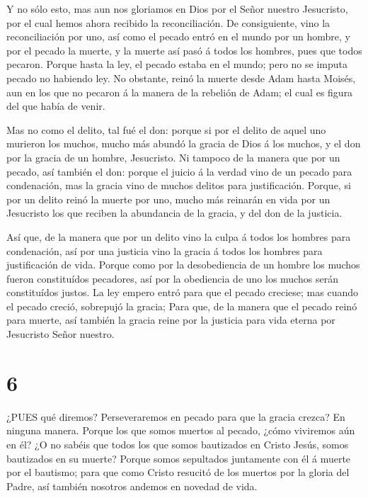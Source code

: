  Y no sólo esto, mas aun nos gloriamos en Dios por el Señor
nuestro Jesucristo, por el cual hemos ahora recibido la reconciliación.
 De consiguiente, vino la reconciliación por uno, así como
el pecado entró en el mundo por un hombre, y por el pecado la muerte, y
la muerte así pasó á todos los hombres, pues que todos pecaron.
 Porque hasta la ley, el pecado estaba en el mundo; pero no
se imputa pecado no habiendo ley.  No obstante, reinó la
muerte desde Adam hasta Moisés, aun en los que no pecaron á la manera de
la rebelión de Adam; el cual es figura del que había de venir.

 Mas no como el delito, tal fué el don: porque si por el
delito de aquel uno murieron los muchos, mucho más abundó la gracia de
Dios á los muchos, y el don por la gracia de un hombre, Jesucristo.
 Ni tampoco de la manera que por un pecado, así también el
don: porque el juicio á la verdad vino de un pecado para condenación,
mas la gracia vino de muchos delitos para justificación. 
Porque, si por un delito reinó la muerte por uno, mucho más reinarán en
vida por un Jesucristo los que reciben la abundancia de la gracia, y del
don de la justicia.

 Así que, de la manera que por un delito vino la culpa á
todos los hombres para condenación, así por una justicia vino la gracia
á todos los hombres para justificación de vida.  Porque
como por la desobediencia de un hombre los muchos fueron constituídos
pecadores, así por la obediencia de uno los muchos serán constituídos
justos.  La ley empero entró para que el pecado creciese;
mas cuando el pecado creció, sobrepujó la gracia;  Para
que, de la manera que el pecado reinó para muerte, así también la gracia
reine por la justicia para vida eterna por Jesucristo Señor nuestro.

\hypertarget{section-5}{%
\section{6}\label{section-5}}

 ¿PUES qué diremos? Perseveraremos en pecado para que la
gracia crezca?  En ninguna manera. Porque los que somos
muertos al pecado, ¿cómo viviremos aún en él?  ¿O no sabéis
que todos los que somos bautizados en Cristo Jesús, somos bautizados en
su muerte?  Porque somos sepultados juntamente con él á
muerte por el bautismo; para que como Cristo resucitó de los muertos por
la gloria del Padre, así también nosotros andemos en novedad de vida.

